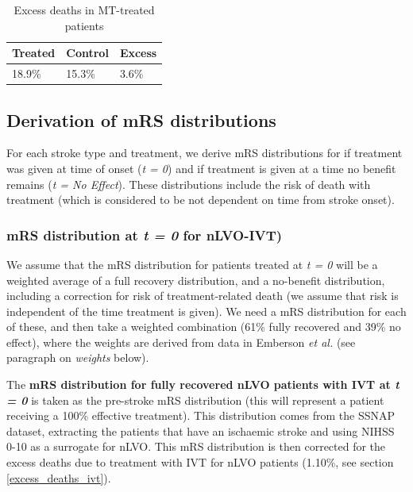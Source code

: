 \begin{table}[!ht]
    \caption{Excess deaths in MT-treated patients}
    \centering
    \begin{tabular}{lll}
    \hline
        Treated & Control & Excess \\ \hline
        18.9\% & 15.3\% & 3.6\% \\ \hline
    \end{tabular}
\end{table}


\subsection{Derivation of mRS distributions}

For each stroke type and treatment, we derive mRS distributions for if treatment was given at time of onset (\textit{t = 0}) and if treatment is given at a time no benefit remains (\textit{t = No Effect}). These distributions include the risk of death with treatment (which is considered to be not dependent on time from stroke onset).

\subsubsection{mRS distribution at \textit{t = 0} for nLVO-IVT)}

We assume that the mRS distribution for patients treated at \textit{t = 0} will be a weighted average of a full recovery distribution, and a no-benefit distribution, including a correction for risk of treatment-related death (we assume that risk is independent of the time treatment is given). We need a mRS distribution for each of these, and then take a weighted combination (61\% fully recovered and 39\% no effect), where the weights are derived from data in Emberson \textit{et al.} \cite{emberson_effect_2014} (see paragraph on \textit{weights} below).

The \textbf{mRS distribution for fully recovered nLVO patients with IVT at \textit{t = 0}} is taken as the pre-stroke mRS distribution (this will represent a patient receiving a 100\% effective treatment). This distribution comes from the SSNAP dataset, extracting the patients that have an ischaemic stroke and using NIHSS 0-10 as a surrogate for nLVO. This mRS distribution is then corrected for the excess deaths due to treatment with IVT for nLVO patients (1.10\%, see section \ref{excess_deaths_ivt}).

